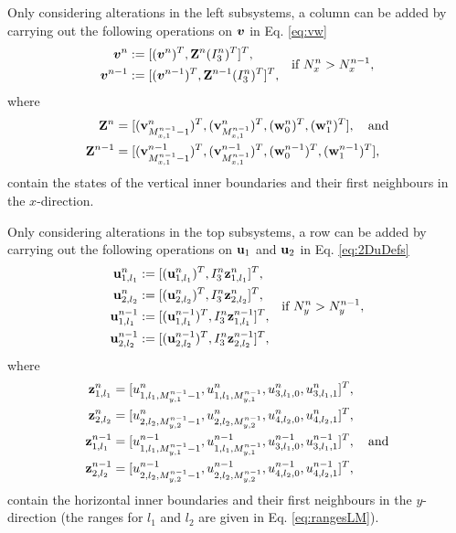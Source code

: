 \documentclass[fleqn]{jaes}
\begin{document}
Only considering alterations in the left subsystems, a column can be added by carrying out the following operations on $\boldsymbol{v}$ in Eq. \eqref{eq:vw}
\begin{equation}
\begin{aligned}
   \vv^n &:= [(\vv^n)^T, \Z^n(I_3^n)^T]^T,\\
   \vv^{n-1} &:= [(\vv^{n-1})^T, \Z^{n-1}(I_3^n)^T]^T,
   \end{aligned} \quad \text{if } N_x^n > N_x^{n-1},
\end{equation}
where
\begin{align*}
\Z^n &= [(\v_{M_{x,1}^{n-1}-1}^n)^T, (\v_{M_{x,1}^{n-1}}^n)^T, (\w_{0}^n)^T, (\w_{1}^n)^T], \quad \text{and}\\
\Z^{n-1} &= [(\v_{M_{x,1}^{n-1}-1}^{n-1})^T, (\v_{M_{x,1}^{n-1}}^{n-1})^T, (\w_{0}^{n-1})^T, (\w_{1}^{n-1})^T],
\end{align*}
contain the states of the vertical inner boundaries and their first neighbours in the $x$-direction. 

Only considering alterations in the top subsystems, a row can be added by carrying out the following operations on $\mathbf{u}_1$ and $\mathbf{u}_2$ in Eq. \eqref{eq:2DuDefs} 
\begin{equation*}
    \begin{aligned}
        \u_{1,l_1}^n &:= [(\u_{1,l_1}^n)^T, I_3^n \z_{1, l_1}^n]^T,\\
        \u_{2,l_2}^n &:= [(\u_{2,l_2}^n)^T, I_3^n \z_{2, l_2}^n]^T,\\
        \u_{1,l_1}^{n-1} &:= [(\u_{1,l_1}^{n-1})^T, I_3^n \z_{1, l_1}^{n-1}]^T,\\
        \u_{2,l_2}^{n-1} &:= [(\u_{2,l_2}^{n-1})^T, I_3^n \z_{2, l_2}^{n-1}]^T,
    \end{aligned}\quad \text{if } N_y^n > N_y^{n-1},
\end{equation*}
where 
\begin{align*}
    \z_{1,l_1}^n &= [u_{1, l_1, M_{y,1}^{n-1}-1}^n, u_{1, l_1, M_{y,1}^{n-1}}^n, u_{3, l_1, 0}^n, u_{3, l_1, 1}^n]^T,\\
    \z_{2,l_2}^n &= [u_{2, l_2, M_{y,2}^{n-1}-1}^n, u_{2, l_2, M_{y,2}^{n-1}}^n, u_{4, l_2, 0}^n, u_{4, l_2, 1}^n]^T,\\
    \z_{1,l_1}^{n-1} &= [u_{1, l_1, M_{y,1}^{n-1}-1}^{n-1}, u_{1, l_1, M_{y,1}^{n-1}}^{n-1}, u_{3, l_1, 0}^{n-1}, u_{3, l_1, 1}^{n-1}]^T, \quad \text{and}\\
    \z_{2,l_2}^{n-1} &= [u_{2, l_2, M_{y,2}^{n-1}-1}^{n-1}, u_{2, l_2, M_{y,2}^{n-1}}^{n-1}, u_{4, l_2, 0}^{n-1}, u_{4, l_2, 1}^{n-1}]^T,
\end{align*}
contain the horizontal inner boundaries and their first neighbours in the $y$-direction (the ranges for $l_1$ and $l_2$ are given in Eq. \eqref{eq:rangesLM}).
\end{document}
